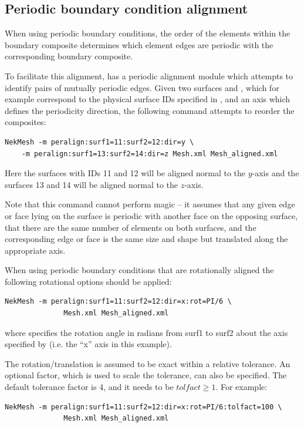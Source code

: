 \subsection{Periodic boundary condition alignment}

When using periodic boundary conditions, the order of the elements within the
boundary composite determines which element edges are periodic with the
corresponding boundary composite.

To facilitate this alignment, \nm has a periodic alignment module
which attempts to identify pairs of mutually periodic edges. Given two
surfaces  and , which for example correspond
to the physical surface IDs specified in \gmsh, and an axis which
defines the periodicity direction, the following command attempts to
reorder the composites:
%
\begin{lstlisting}[style=BashInputStyle]
NekMesh -m peralign:surf1=11:surf2=12:dir=y \
    -m peralign:surf1=13:surf2=14:dir=z Mesh.xml Mesh_aligned.xml
\end{lstlisting}
%
Here the surfaces with IDs 11 and 12 will be aligned normal to the $y$-axis and
the surfaces 13 and 14 will be aligned normal to the $z$-axis.

Note that this command cannot perform magic -- it assumes that any given edge or
face lying on the surface is periodic with another face on the opposing surface,
that there are the same number of elements on both surfaces, and the
corresponding edge or face is the same size and shape but translated along the
appropriate axis.


When using periodic boundary conditions that are rotationally aligned the
following rotational options should be applied:
%
\begin{lstlisting}[style=BashInputStyle]
NekMesh -m peralign:surf1=11:surf2=12:dir=x:rot=PI/6 \
              Mesh.xml Mesh_aligned.xml
\end{lstlisting}
%
where  specifies the rotation angle in radians from
surf1 to surf2 about the axis specified by  (i.e. the ``x'' axis in
this example).

The rotation/translation is assumed to be exact within a relative tolerance.
An optional factor, which is used to scale the tolerance, 
can also be specified. The default tolerance factor is 4, and it needs to be
$tolfact \ge 1$. For example:
%
\begin{lstlisting}[style=BashInputStyle]
NekMesh -m peralign:surf1=11:surf2=12:dir=x:rot=PI/6:tolfact=100 \
              Mesh.xml Mesh_aligned.xml
\end{lstlisting}
%

